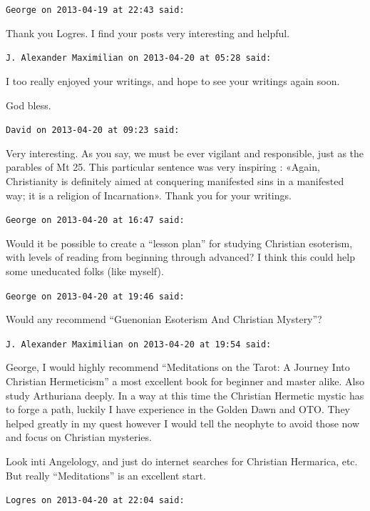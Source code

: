 \begin{footnotesize}
\begin{sffamily}
\texttt{George on 2013-04-19 at 22:43 said:}

Thank you Logres. I find your posts very interesting and helpful.

\hfill

\texttt{J. Alexander Maximilian on 2013-04-20 at 05:28 said:}

I too really enjoyed your writings, and hope to see your writings again soon.

God bless.

\hfill

\texttt{David on 2013-04-20 at 09:23 said:}

Very interesting. As you say, we must be ever vigilant and responsible, just as the parables of Mt 25. This particular sentence was very inspiring : «Again, Christianity is definitely aimed at conquering manifested sins in a manifested way; it is a religion of Incarnation». Thank you for your writings.

\hfill

\texttt{George on 2013-04-20 at 16:47 said:}

Would it be possible to create a ``lesson plan'' for studying Christian esoterism, with levels of reading from beginning through advanced? I think this could help some uneducated folks (like myself).

\hfill

\texttt{George on 2013-04-20 at 19:46 said:}

Would any recommend ``Guenonian Esoterism And Christian Mystery''?

\hfill

\texttt{J. Alexander Maximilian on 2013-04-20 at 19:54 said:}

George, I would highly recommend ``Meditations on the Tarot: A Journey Into Christian Hermeticism'' a most excellent book for beginner and master alike. Also study Arthuriana deeply. In a way at this time the Christian Hermetic mystic has to forge a path, luckily I have experience in the Golden Dawn and OTO. They helped greatly in my quest however I would tell the neophyte to avoid those now and focus on Christian mysteries.

Look inti Angelology, and just do internet searches for Christian Hermarica, etc. But really ``Meditations'' is an excellent start.

\hfill

\texttt{Logres on 2013-04-20 at 22:04 said:}


\end{sffamily}
\end{footnotesize}
